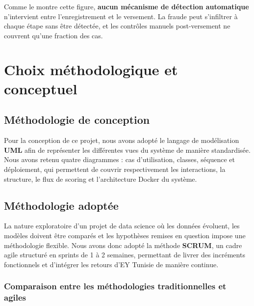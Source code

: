 \documentclass[a4paper, oneside, 12pt]{book}
\begin{document}
\hspace{0.5cm}Comme le montre cette figure, \textbf{aucun mécanisme de détection automatique} n'intervient entre l'enregistrement et le versement. La fraude peut s'infiltrer à chaque étape sans être détectée, et les contrôles manuels post-versement ne couvrent qu'une fraction des cas.
 


\section{Choix méthodologique et conceptuel}

\subsection{Méthodologie de conception}
\hspace{0.5cm}Pour la conception de ce projet, nous avons adopté le langage de modélisation \textbf{UML} afin de représenter les différentes vues du système de manière standardisée. Nous avons retenu quatre diagrammes : cas d'utilisation, classes, séquence et déploiement, qui permettent de couvrir respectivement les interactions, la structure, le flux de scoring et l'architecture Docker du système.

\subsection{Méthodologie adoptée}
\hspace{0.5cm}La nature exploratoire d'un projet de data science où les données évoluent, les modèles doivent être comparés et les hypothèses remises en question impose une méthodologie flexible. Nous avons donc adopté la méthode \textbf{SCRUM}, un cadre agile structuré en sprints de 1 à 2 semaines, permettant de livrer des incréments fonctionnels et d'intégrer les retours d'EY Tunisie de manière continue.

\subsubsection{Comparaison entre les méthodologies traditionnelles et agiles}
\end{document}
